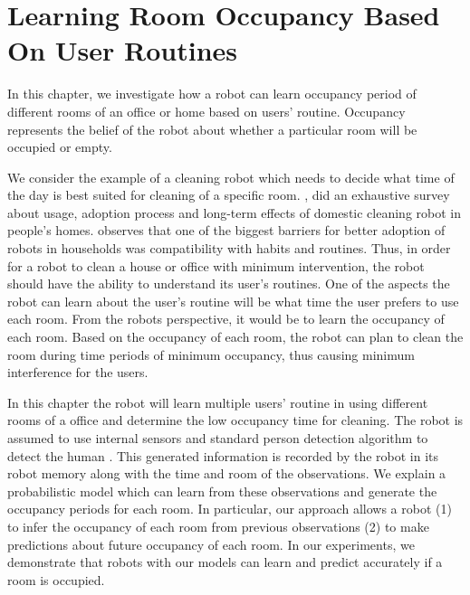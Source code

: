 \chapter{Learning Room Occupancy Based On User Routines}
\label{chapter:occupancy}
In this chapter, we investigate how a robot can learn occupancy period of different rooms of an office or home based on users' routine. Occupancy represents the belief of the robot about whether a particular room will be occupied or empty. 

We consider the example of a cleaning robot which needs to decide what time of the day is best suited for cleaning of a specific room. \cite{Fink2013},  did an exhaustive survey about usage, adoption process and long-term effects of domestic cleaning robot in people's homes. \citeauthor{Fink2013} observes that one of the biggest barriers for better adoption of robots in households was compatibility with habits and routines. Thus, in order for a robot to clean a house or office with minimum intervention, the robot should have the ability to understand its user's routines. One of the aspects the robot can learn about the user's routine will be what time the user prefers to use each room. From the robots perspective, it would be to learn the occupancy of each room. Based on the occupancy of each room, the robot can plan to clean the room during time periods of minimum occupancy, thus causing minimum interference for the users.

In this chapter the robot will learn multiple users' routine in using different rooms of a office and determine the low occupancy time for cleaning.
The robot is assumed to use internal sensors and standard person detection algorithm to detect the human \cite{linder16multi, jafari2014real}. This generated information is recorded by the robot in its robot memory along with the time and room of the observations. We explain a probabilistic model which can learn from these observations and generate the occupancy periods for each room. In particular, our approach allows a robot (1) to infer the occupancy of each room from previous observations (2) to make predictions about future occupancy of each room. In our experiments, we demonstrate that robots with our models can learn and predict accurately if a room is occupied.



